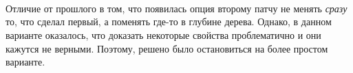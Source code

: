 \begin{code}
\\
\>[0]\<[4]%
\>[4] \AgdaSymbol{:}  \AgdaSymbol{\{}   \AgdaSymbol{\}} \<[32]%
\>[32]\<%
\\
\>[4]\<[6]%
\>[6] \AgdaSymbol{\{} \AgdaSymbol{:}  \AgdaSymbol{\}} \AgdaSymbol{\{} \AgdaSymbol{:}  \AgdaSymbol{\}} \AgdaSymbol{\{} \AgdaSymbol{:}  \AgdaSymbol{\}} \AgdaSymbol{\{} \AgdaSymbol{:}  \AgdaSymbol{\}}\<%
\\
\>[4]\<[6]%
\>[6] \AgdaSymbol{(} \AgdaSymbol{:}   \AgdaSymbol{)}  \AgdaSymbol{(} \AgdaSymbol{:}   \AgdaSymbol{)}            \<%
\end{code}

Отличие от прошлого в том, что появилась опция второму патчу не менять
\emph{сразу} то, что сделал первый, а поменять где-то в глубине
дерева. Однако, в данном варианте оказалось, что доказать некоторые
свойства проблематично и они кажутся не верными. Поэтому, решено
было остановиться на более простом варианте.

